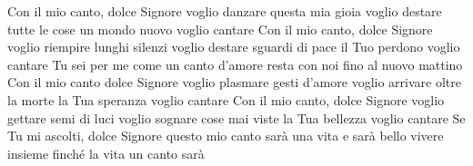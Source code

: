 \beginverse
Con il mio canto, dolce Signore
voglio danzare questa mia gioia
voglio destare tutte le cose
un mondo nuovo voglio cantare
Con il mio canto, dolce Signore
voglio riempire lunghi silenzi
voglio destare sguardi di pace
il Tuo perdono voglio cantare
\endverse
\beginchorus
Tu sei per me come un canto d'amore
resta con noi fino al nuovo mattino
\endchorus
\beginverse
Con il mio canto dolce Signore
voglio plasmare gesti d'amore
voglio arrivare oltre la morte
la Tua speranza voglio cantare
Con il mio canto, dolce Signore
voglio gettare semi di luci
voglio sognare cose mai viste
la Tua bellezza voglio cantare
Se Tu mi ascolti, dolce Signore
questo mio canto sarà una vita
e sarà bello vivere insieme
finché la vita un canto sarà
\endverse
\endsong

